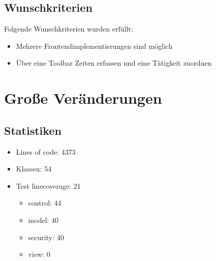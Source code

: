\begin{frame}
	\subsection{Wunschkriterien}
	Folgende Wunschkriterien wurden erfüllt:
	\begin{itemize}
		\item Mehrere Frontendimplementierungen sind möglich
		\item Über eine Toolbar Zeiten erfassen und eine Tätigkeit zuordnen
	\end{itemize}
\end{frame}

\section{Große Veränderungen}


\begin{frame}
	\section{Statistiken}
	\begin{itemize}
		\item Lines of code: 4373
		\item Klassen: 54
		\item Test linecoverage: 21%
		\begin{itemize}
			\item control: 44%
			\item model: 40%
			\item security: 40%
			\item view: 0%
		\end{itemize}
	\end{itemize}
\end{frame}



